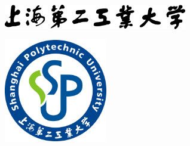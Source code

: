 \pagestyle{empty}

\linespread{0.8}

\vspace*{\fill}

\begin{figure}[htbp!]
  \centering
  \includegraphics[width=8cm]{../assets/sspu_title_black.eps}
\end{figure}

\begin{center}
  \sffamily\bfseries
  \primaryTitle
\end{center}

\begin{figure}[htbp!]
  \centering
  \includegraphics[height=4.5cm,width=4.5cm]{../assets/sspu_logo.eps}
\end{figure}

\vspace{2em}


